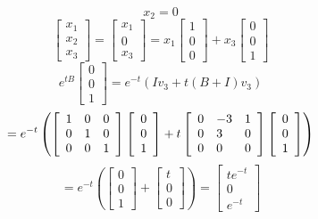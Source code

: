 \documentclass[12pt,letterpaper,reqno]{amsart}
\begin{document}
\begin{enumerate}
\begin{enumerate}
    $$x_2 = 0$$
    $$\left[ \begin{array} { l } { x_1 } \\ { x_2 } \\ { x_3 } \end{array} \right] = \left[ \begin{array} { l } { x_1 } \\ { 0 } \\ { x_3 } \end{array} \right] = x_1 \left[ \begin{array} { l } { 1 } \\ { 0 } \\ { 0 } \end{array} \right] + x_3 \left[ \begin{array} { l } { 0 } \\ { 0 } \\ { 1 } \end{array} \right]$$
    $$e^{tB}\left[ \begin{array} { l } { 0 } \\ { 0 } \\ { 1 } \end{array} \right] = e^{-t}(Iv_3+t(B+I)v_3)$$
    $$= e^{-t}\left(\left[ \begin{array} { l l l } { 1 } & { 0 } & { 0 } \\ { 0 } & { 1 } & { 0 } \\ { 0 } & { 0 } & { 1 } \end{array} \right]\left[ \begin{array} { l } { 0 } \\ { 0 } \\ { 1 } \end{array} \right]+t\left[ \begin{array} { l l l } { 0 } & { -3 } & { 1 } \\ { 0 } & { 3 } & { 0 } \\ { 0 } & { 0 } & { 0 } \end{array} \right]\left[ \begin{array} { l } { 0 } \\ { 0 } \\ { 1 } \end{array} \right]\right)$$
    $$= e^{-t}\left(\left[ \begin{array} { l } { 0 } \\ { 0 } \\ { 1 } \end{array} \right] + \left[ \begin{array} { l } { t } \\ { 0 } \\ { 0 } \end{array} \right]\right) = \left[ \begin{array} { l } { te^{-t} } \\ { 0 } \\ { e^{-t} } \end{array} \right]$$

\end{enumerate}
\end{enumerate}
\end{document}
